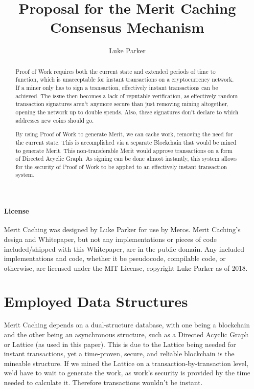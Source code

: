 \documentclass[14pt]{article}
\title{Proposal for the Merit Caching Consensus Mechanism}
\author{Luke Parker}
\begin{document}
\maketitle

\label{sec:abstract}
\begin{abstract}
Proof of Work requires both the current state and extended periods of time to function, which is unacceptable for instant transactions on a cryptocurrency network. If a miner only has to sign a transaction, effectively instant transactions can be achieved. The issue then becomes a lack of reputable verification, as effectively random transaction signatures aren't anymore secure than just removing mining altogether, opening the network up to double spends. Also, these signatures don't declare to which addresses new coins should go.

By using Proof of Work to generate Merit, we can cache work, removing the need for the current state. This is accomplished via a separate Blockchain that would be mined to generate Merit. This non-transferable Merit would approve transactions on a form of Directed Acyclic Graph. As signing can be done almost instantly, this system allows for the security of Proof of Work to be applied to an effectively instant transaction system.
\end{abstract}

\label{sec:license}
\paragraph{License}
Merit Caching was designed by Luke Parker for use by Meros. Merit Caching's design and Whitepaper, but not any implementations or pieces of code included/shipped with this Whitepaper, are in the public domain. Any included implementations and code, whether it be pseudocode, compilable code, or otherwise, are licensed under the MIT License, copyright Luke Parker as of 2018.

\newpage

\label{sec:toc}
\setcounter{tocdepth}{3}
\tableofcontents

\newpage

\label{sec:1}
\section{Employed Data Structures}
Merit Caching depends on a dual-structure database, with one being a blockchain and the other being an asynchronous structure, such as a Directed Acyclic Graph or Lattice (as used in this paper). This is due to the Lattice being needed for instant transactions, yet a time-proven, secure, and reliable blockchain is the mineable structure. If we mined the Lattice on a transaction-by-transaction level, we'd have to wait to generate the work, as work's security is provided by the time needed to calculate it. Therefore transactions wouldn't be instant.
\end{document}

